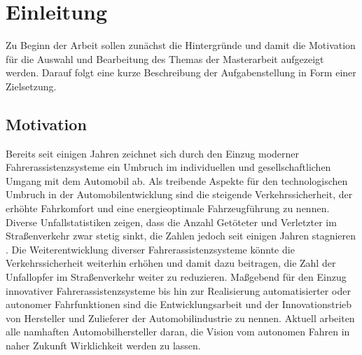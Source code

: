 \chapter{Einleitung} \label{cha:einleitung}
Zu Beginn der Arbeit sollen zunächst die Hintergründe und damit die Motivation für die Auswahl und Bearbeitung des Themas der Masterarbeit aufgezeigt werden. Darauf folgt eine kurze Beschreibung der Aufgabenstellung in Form einer Zielsetzung. 


\section{Motivation} \label{sec:motivation}
Bereits seit einigen Jahren zeichnet sich durch den Einzug moderner Fahrerassistenzsysteme ein Umbruch im individuellen und gesellschaftlichen Umgang mit dem Automobil ab. Als treibende Aspekte für den technologischen Umbruch in der Automobilentwicklung sind die steigende Verkehrssicherheit, der erhöhte Fahrkomfort und eine energieoptimale Fahrzeugführung zu nennen. Diverse Unfallstatistiken zeigen, dass die Anzahl Getöteter und Verletzter im Straßenverkehr zwar stetig sinkt, die Zahlen jedoch seit einigen Jahren stagnieren \cite{DeutscherVerkehrssicherheitsrat.2018}. Die Weiterentwicklung diverser Fahrerassistenzsysteme könnte die Verkehrssicherheit weiterhin erhöhen und damit dazu beitragen, die Zahl der Unfallopfer im Straßenverkehr weiter zu reduzieren. Maßgebend für den Einzug innovativer Fahrerassistenzsysteme bis hin zur Realisierung automatisierter oder autonomer Fahrfunktionen sind die Entwicklungsarbeit und der Innovationstrieb von Hersteller und Zulieferer der Automobilindustrie zu nennen. Aktuell arbeiten alle namhaften Automobilhersteller daran, die Vision vom autonomen Fahren in naher Zukunft Wirklichkeit werden zu lassen.

